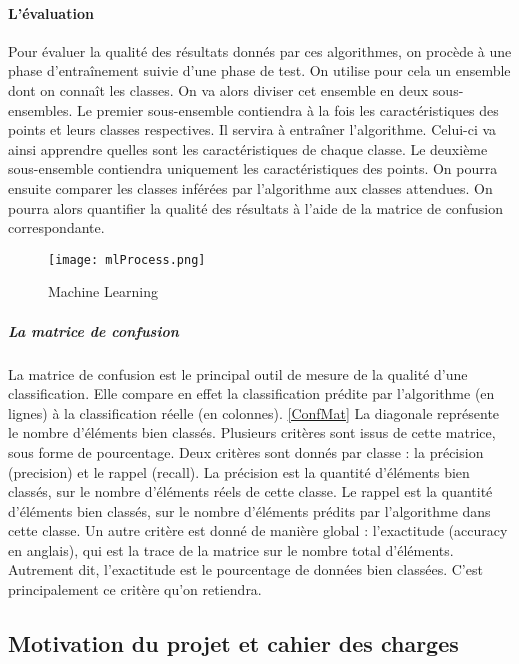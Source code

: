 \paragraph{L'évaluation\newline}
Pour évaluer la qualité des résultats donnés par ces algorithmes, on procède à une phase d'entraînement suivie d'une phase de test. 
On utilise pour cela un ensemble dont on connaît les classes. On va alors diviser cet ensemble en deux sous-ensembles. Le premier sous-ensemble contiendra à la fois les caractéristiques des points et leurs classes respectives. Il servira à entraîner l'algorithme. Celui-ci va ainsi apprendre quelles sont les caractéristiques de chaque classe. Le deuxième sous-ensemble contiendra uniquement les caractéristiques des points. On pourra ensuite comparer les classes inférées par l'algorithme aux classes attendues. On pourra alors quantifier la qualité des résultats à l'aide de la matrice de confusion correspondante. 

\begin{figure}[H]
  \centering
    \texttt{[image: mlProcess.png]}
  \caption{Machine Learning}
  \label{fig:ml}
\end{figure}

\subparagraph{La matrice de confusion\newline}
La matrice de confusion est le principal outil de mesure de la qualité d'une classification. Elle compare en effet la classification prédite par l'algorithme (en lignes) à la classification réelle (en colonnes). \ref{ConfMat}
La diagonale représente le nombre d'éléments bien classés. 
Plusieurs critères sont issus de cette matrice, sous forme de pourcentage. Deux critères sont donnés par classe : la précision (precision) et le rappel (recall). La précision est la quantité d'éléments bien classés, sur le nombre d'éléments réels de cette classe. Le rappel est la quantité d'éléments bien classés, sur le nombre d'éléments prédits par l'algorithme dans cette classe.
Un autre critère est donné de manière global : l'exactitude (accuracy en anglais), qui est la trace de la matrice sur le nombre total d'éléments. Autrement dit, l'exactitude est le pourcentage de données bien classées. C'est principalement ce critère qu'on retiendra.




\subsection{Motivation du projet et cahier des charges}


